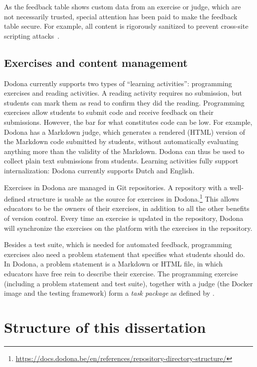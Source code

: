\documentclass[../main]{subfiles}
\begin{document}
As the feedback table shows custom data from an exercise or judge, which are not necessarily trusted, special attention has been paid to make the feedback table secure.
For example, all content is rigorously sanitized to prevent cross-site scripting attacks~\autocite{guptaCrossSiteScriptingXSS2017}.

\subsection{Exercises and content management}\label{subsec:exercises-and-content-management}

Dodona currently supports two types of ``learning activities'': programming exercises and reading activities.
A reading activity requires no submission, but students can mark them as read to confirm they did the reading.
Programming exercises allow students to submit code and receive feedback on their submissions.
However, the bar for what constitutes code can be low.
For example, Dodona has a Markdown judge, which generates a rendered (HTML) version of the Markdown code submitted by students, without automatically evaluating anything more than the validity of the Markdown.
Dodona can thus be used to collect plain text submissions from students.
Learning activities fully support internalization: Dodona currently supports Dutch and English.

Exercises in Dodona are managed in Git repositories.
A repository with a well-defined structure is usable as the source for exercises in Dodona.\footnote{\url{https://docs.dodona.be/en/references/repository-directory-structure/}}
This allows educators to be the owners of their exercises, in addition to all the other benefits of version control.
Every time an exercise is updated in the repository, Dodona will synchronize the exercises on the platform with the exercises in the repository.

Besides a test suite, which is needed for automated feedback, programming exercises also need a problem statement that specifies what students should do.
In Dodona, a problem statement is a Markdown or HTML file, in which educators have free rein to describe their exercise.
The programming exercise (including a problem statement and test suite), together with a judge (the Docker image and the testing framework) form a \emph{task package} as defined by \textcite{verhoeffProgrammingTaskPackages2008}.

\section{Structure of this dissertation}\label{sec:a-note-on-the-structure-of-this-thesis}
\end{document}
